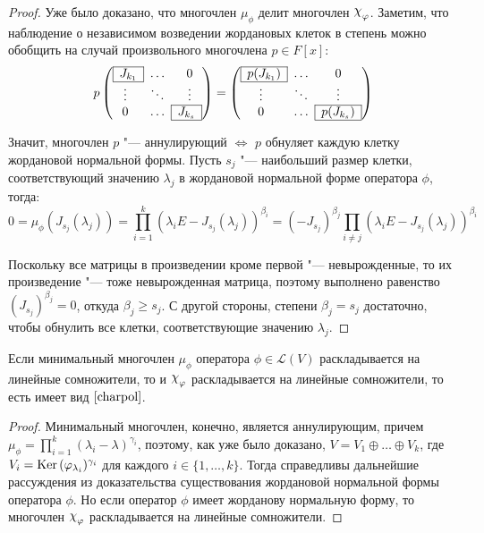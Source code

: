 \begin{proof}
	Уже было доказано, что многочлен $\mu_\phi$ делит многочлен $\Chi_\phi$. Заметим, что наблюдение о независимом возведении жордановых клеток в степень можно обобщить на случай произвольного многочлена $p \in F[x]$:
	\[p\left(\begin{array}{@{}ccc@{}}
		\cline{1-1}
		\multicolumn{1}{|c|}{J_{k_1}} & \dots & 0\\
		\cline{1-1}
		\vdots & \ddots & \vdots\\
		\cline{3-3}
		0 & \dots & \multicolumn{1}{|c|}{J_{k_s}}\\
		\cline{3-3}
	\end{array}\right) = \left(\begin{array}{@{}cccc@{}}
		\cline{1-1}
		\multicolumn{1}{|c|}{p(J_{k_1})} & \dots & 0\\
		\cline{1-1}
		\vdots & \ddots & \vdots\\
		\cline{3-3}
		0 & \dots & \multicolumn{1}{|c|}{p(J_{k_s})}\\
		\cline{3-3}
	\end{array}\right)\]
	
	Значит, многочлен $p$ "--- аннулирующий $\Leftrightarrow$ $p$ обнуляет каждую клетку жордановой нормальной формы. Пусть $s_j$ "--- наибольший размер клетки, соответствующий значению $\lambda_j$ в жордановой нормальной форме оператора $\phi$, тогда:
	\[0 = \mu_\phi(J_{s_j}(\lambda_j)) = \prod_{i = 1}^k(\lambda_iE - J_{s_j}(\lambda_j))^{\beta_i} = (-J_{s_j})^{\beta_j}\prod_{i \ne j}(\lambda_iE - J_{s_j}(\lambda_j))^{\beta_i}\]
	
	Поскольку все матрицы в произведении кроме первой "--- невырожденные, то их произведение "--- тоже невырожденная матрица, поэтому выполнено равенство $(J_{s_j})^{\beta_j} = 0$, откуда $\beta_j \ge s_j$. С другой стороны, степени $\beta_j = s_j$ достаточно, чтобы обнулить все клетки, соответствующие значению $\lambda_j$.
\end{proof}

\begin{proposition}
	Если минимальный многочлен $\mu_\phi$ оператора $\phi \in \mathcal{L}(V)$ раскладывается на линейные сомножители, то и $\Chi_\phi$ раскладывается на линейные сомножители, то есть имеет вид $\eqref*{charpol}$.
\end{proposition}

\begin{proof}
	Минимальный многочлен, конечно, является аннулирующим, причем $\mu_\phi = \prod_{i = 1}^k(\lambda_i - \lambda)^{\gamma_i}$, поэтому, как уже было доказано, $V = V_1 \oplus \dots \oplus V_k$, где $V_i = \operatorname{Ker}{(\varphi_{\lambda_i})^{\gamma_i}}$ для каждого $i \in \{1, \dotsc, k\}$. Тогда справедливы дальнейшие рассуждения из доказательства существования жордановой нормальной формы оператора $\phi$. Но если оператор $\phi$ имеет жорданову нормальную форму, то многочлен $\Chi_\phi$ раскладывается на линейные сомножители.
\end{proof}

